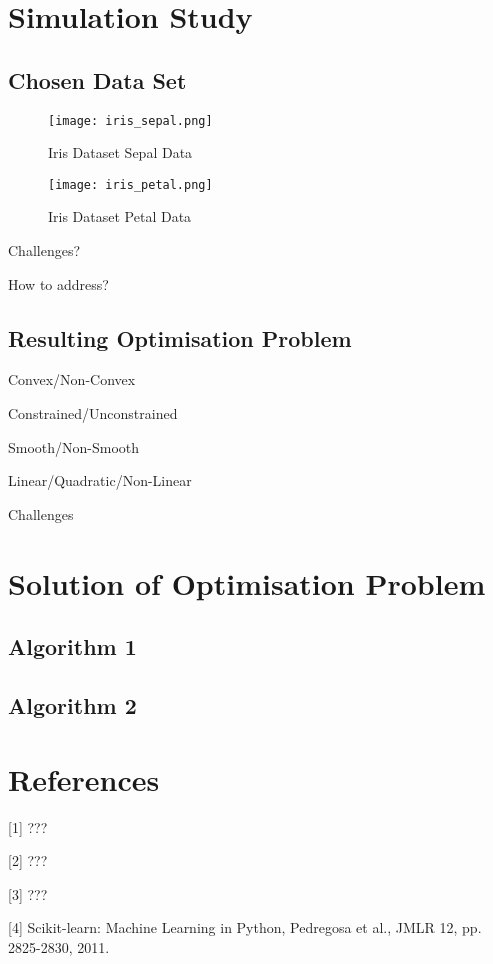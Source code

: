 \documentclass[10pt, a4paper]{amsart}
\begin{document}
\section{Simulation Study}

\subsection{Chosen Data Set}\hfill

\begin{figure}
	\centering	
	\texttt{[image: iris\_sepal.png]}
	\caption{Iris Dataset Sepal Data}
\end{figure}

\begin{figure}
	\centering	
	\texttt{[image: iris\_petal.png]}
	\caption{Iris Dataset Petal Data}
\end{figure}

Challenges?

How to address?

\subsection{Resulting Optimisation Problem}\hfill

Convex/Non-Convex

Constrained/Unconstrained

Smooth/Non-Smooth

Linear/Quadratic/Non-Linear

Challenges


\section{Solution of Optimisation Problem}

\subsection{Algorithm 1}\hfill

\subsection{Algorithm 2}\hfill


\section{References}

[1] ???

[2] ???

[3] ???

[4] Scikit-learn: Machine Learning in Python, Pedregosa et al., JMLR 12, pp. 2825-2830, 2011.
\end{document}
